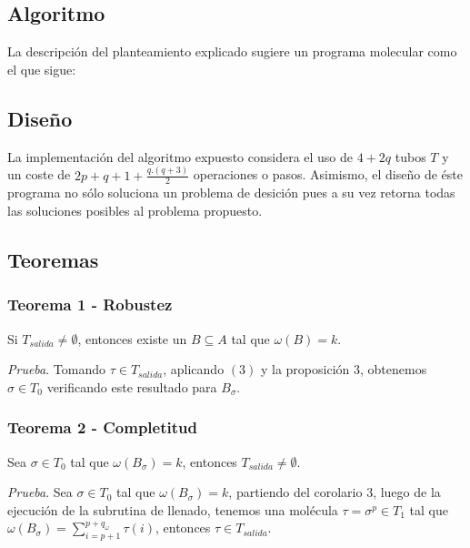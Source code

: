 \documentclass[12pt, letterpaper, twoside]{article}
\begin{document}
    \subsection{Algoritmo}
    La descripción del planteamiento explicado sugiere un programa molecular como el que sigue:
    \begin{algorithm}
        \begin{algorithmic}[1]
            \EndProcedure
        \end{algorithmic}
    \end{algorithm}

    \newpage
    \subsection{Diseño}

    La implementación del algoritmo expuesto considera el uso de $4+2q$ tubos $T$ y un coste de $2p+q+1+\frac{q.(q+3)}{2}$ operaciones o pasos. Asimismo, el diseño de éste programa no sólo soluciona un problema de desición pues a su vez retorna todas las soluciones posibles al problema propuesto.

    \subsection{Teoremas}
    \subsubsection{Teorema 1 - Robustez}
    Si $T_{salida}\neq\emptyset$, entonces existe un $B\subseteq{A}$ tal que $\omega(B)=k$.

    \emph{Prueba}. Tomando $\tau\in{T_{salida}}$, aplicando $(3)$ y la proposición 3, obtenemos $\sigma\in{T_0}$ verificando este resultado para $B_\sigma$.

    \subsubsection{Teorema 2 - Completitud}
    Sea $\sigma\in{T_0}$ tal que $\omega(B_\sigma)=k$, entonces $T_{salida}\neq\emptyset$.

    \emph{Prueba}. Sea $\sigma\in{T_0}$ tal que $\omega(B_\sigma)=k$, partiendo del corolario 3, luego de la ejecución de la subrutina de llenado, tenemos una molécula $\tau=\sigma^{p}\in{T_1}$ tal que $\omega(B_\sigma)=\sum^{p+q_\omega}_{i=p+1}\tau(i)$, entonces $\tau\in{T_{salida}}$.
\end{document}
